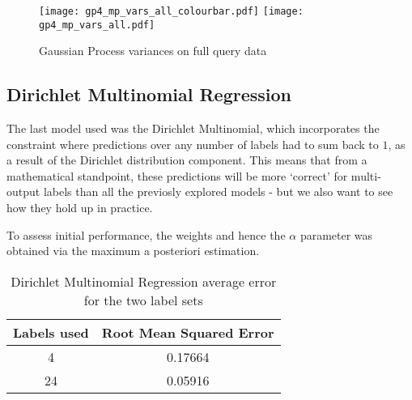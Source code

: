 \begin{figure}[H]
    \centering
    \texttt{[image: gp4\_mp\_vars\_all\_colourbar.pdf]}
    \texttt{[image: gp4\_mp\_vars\_all.pdf]}
    \label{fig:gpm4_simple_vars}
    \caption{Gaussian Process variances on full query data}
\end{figure}


\subsection{Dirichlet Multinomial Regression}

The last model used was the Dirichlet Multinomial, which incorporates the constraint where predictions over any number of labels had to sum back to $1$, as a result of the Dirichlet distribution component. This means that from a mathematical standpoint, these predictions will be more `correct' for multi-output labels than all the previosly explored models - but we also want to see how they hold up in practice.

To assess initial performance, the weights and hence the $\alpha$ parameter was obtained via the maximum a posteriori estimation.



\begin{table}[H]
    \centering
    \begin{tabular}{|c|c|}
        \hline
        Labels used & Root Mean Squared Error \\\hline
        4 & 0.17664\\
        24  & 0.05916\\
        \hline
    \end{tabular}
    \label{table:dmbasicresults}
    \caption{Dirichlet Multinomial Regression average error for the two label sets}
\end{table}

